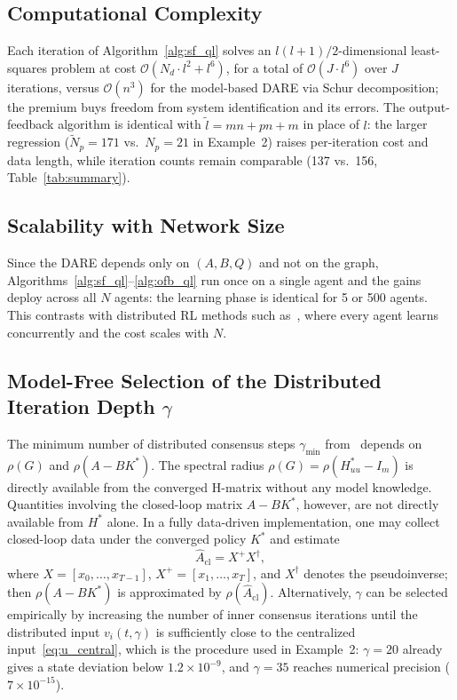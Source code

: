 \documentclass[final,5p,times]{elsarticle}
\theoremstyle{plain}
\theoremstyle{definition}
\theoremstyle{remark}
\begin{document}
\subsection{Computational Complexity}
\label{subsec:complexity}
Each iteration of Algorithm~\ref{alg:sf_ql} solves an $l(l+1)/2$-dimensional least-squares problem at cost $\mathcal{O}(N_d \cdot l^2 + l^6)$, for a total of $\mathcal{O}(J \cdot l^6)$ over $J$ iterations, versus $\mathcal{O}(n^3)$ for the model-based DARE via Schur decomposition; the premium buys freedom from system identification and its errors. The output-feedback algorithm is identical with $\tilde{l} = mn+pn+m$ in place of $l$: the larger regression ($\tilde{N}_p = 171$ vs.\ $N_p = 21$ in Example~2) raises per-iteration cost and data length, while iteration counts remain comparable (137 vs.\ 156, Table~\ref{tab:summary}).
\subsection{Scalability with Network Size}
\label{subsec:scalability}
Since the DARE depends only on $(A,B,Q)$ and not on the graph, Algorithms~\ref{alg:sf_ql}--\ref{alg:ofb_ql} run once on a single agent and the gains deploy across all $N$ agents: the learning phase is identical for 5 or 500 agents. This contrasts with distributed RL methods such as~\cite{zhang2011}, where every agent learns concurrently and the cost scales with $N$.
\subsection{Model-Free Selection of the Distributed Iteration Depth \texorpdfstring{$\gamma$}{gamma}}
\label{subsec:gamma}
The minimum number of distributed consensus steps $\gamma_{\min}$ from~\cite[Thm.~3.4]{cacace2024} depends on $\rho(G)$ and $\rho(A - BK^*)$. The spectral radius $\rho(G) = \rho(H_{uu}^* - I_m)$ is directly available from the converged H-matrix without any model knowledge. Quantities involving the closed-loop matrix $A - BK^*$, however, are not directly available from $H^*$ alone. In a fully data-driven implementation, one may collect closed-loop data under the converged policy $K^*$ and estimate
\begin{equation}
\hat{A}_{\mathrm{cl}} = X^+ X^\dagger,
\label{eq:Acl}
\end{equation}
where $X = [x_0, \ldots, x_{T-1}]$, $X^+ = [x_1, \ldots, x_T]$, and $X^\dagger$ denotes the pseudoinverse; then $\rho(A - BK^*)$ is approximated by $\rho(\hat{A}_{\mathrm{cl}})$. Alternatively, $\gamma$ can be selected empirically by increasing the number of inner consensus iterations until the distributed input $v_i(t,\gamma)$ is sufficiently close to the centralized input~\eqref{eq:u_central}, which is the procedure used in Example~2: $\gamma = 20$ already gives a state deviation below $1.2\times10^{-9}$, and $\gamma = 35$ reaches numerical precision ($7\times10^{-15}$).
\end{document}
